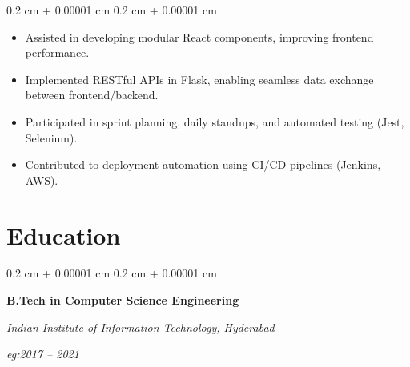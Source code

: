 \documentclass[10pt, letterpaper]{article}
\newenvironment{highlightsforbulletentries}{
        \begin{itemize}[
            topsep=0.10 cm,
            parsep=0.10 cm,
            partopsep=0pt,
            itemsep=0pt,
            leftmargin=10pt
        ]
    }{
        \end{itemize}
    }
\newenvironment{onecolentry}{
        \begin{adjustwidth}{
            0.2 cm + 0.00001 cm
        }{
            0.2 cm + 0.00001 cm
        }
    }{
        \end{adjustwidth}
    }
\newenvironment{twocolentry}[2][]{
        \onecolentry
        \def\secondColumn{#2}
        \setcolumnwidth{\fill, 4.5 cm}
        \begin{paracol}{2}
    }{
        \switchcolumn \raggedleft \secondColumn
        \end{paracol}
        \endonecolentry
    }
\begin{document}
            \vspace{0.10 cm}
            \begin{onecolentry}
                \begin{highlightsforbulletentries}
                    \item \textbf{} Assisted in developing modular React components, improving frontend performance.
                    \vspace{-2pt}
                    \item \textbf{} Implemented RESTful APIs in Flask, enabling seamless data exchange between frontend/backend.
                    \vspace{-2pt}
                    \item \textbf{} Participated in sprint planning, daily standups, and automated testing (Jest, Selenium).
                    \vspace{-2pt}
                    \item \textbf{} Contributed to deployment automation using CI/CD pipelines (Jenkins, AWS).
                    \vspace{-2pt}
            \end{highlightsforbulletentries}
            \end{onecolentry}
            \vspace{0.2 cm}
        \section{Education}
            \begin{twocolentry}{
                \textit{eg:2017 – 2021}}
                \textbf{B.Tech in Computer Science Engineering}

                \textit{Indian Institute of Information Technology, Hyderabad}
            \end{twocolentry}
\end{document}

